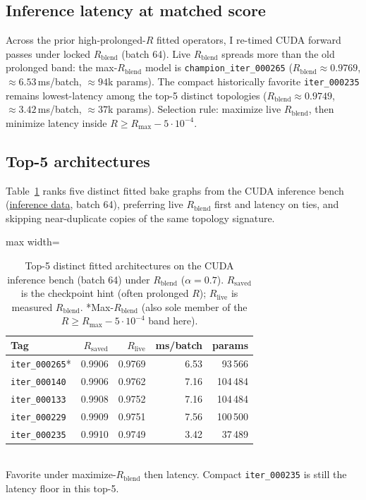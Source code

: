 \subsection{Inference latency at matched score}
\label{sec:inference-latency}
Across the prior high-prolonged-$R$ fitted operators, I re-timed CUDA forward passes under locked $R_{\mathrm{blend}}$ (batch 64).
Live $R_{\mathrm{blend}}$ spreads more than the old prolonged band: the max-$R_{\mathrm{blend}}$ model is
\texttt{champion\_iter\_000265} ($R_{\mathrm{blend}}{\approx}0.9769$, $\approx 6.53$\,ms/batch, $\approx 94$k params).
The compact historically favorite \texttt{iter\_000235} remains lowest-latency among the top-5 distinct topologies
($R_{\mathrm{blend}}{\approx}0.9749$, $\approx 3.42$\,ms/batch, $\approx 37$k params).
Selection rule: maximize live $R_{\mathrm{blend}}$, then minimize latency inside $R\ge R_{\max}-5\cdot10^{-4}$.

\subsection{Top-5 architectures}
\label{sec:top5-arch}
Table~\ref{tab:top5} ranks five distinct fitted bake graphs from the CUDA inference bench
(\href{https://github.com/reeldemo/denoise-opt}{inference data}, batch 64), preferring live $R_{\mathrm{blend}}$ first and latency on ties,
and skipping near-duplicate copies of the same topology signature.

\begin{table}[htbp]
  \centering
  \caption{Top-5 distinct fitted architectures on the CUDA inference bench (batch 64) under $R_{\mathrm{blend}}$ ($\alpha{=}0.7$).
  $R_{\mathrm{saved}}$ is the checkpoint hint (often prolonged $R$); $R_{\mathrm{live}}$ is measured $R_{\mathrm{blend}}$.
  *Max-$R_{\mathrm{blend}}$ (also sole member of the $R\ge R_{\max}-5\cdot10^{-4}$ band here).}
  \label{tab:top5}
  \setlength{\tabcolsep}{3pt}
  \begin{adjustbox}{max width=\columnwidth}
\begin{tabular}{@{}lrrrr@{}}
    \toprule
    Tag & $R_{\mathrm{saved}}$ & $R_{\mathrm{live}}$ & ms/batch & params \\
    \midrule
    \texttt{iter\_000265}* & 0.9906 & 0.9769 & 6.53 & 93\,566 \\
    \texttt{iter\_000140} & 0.9906 & 0.9762 & 7.16 & 104\,484 \\
    \texttt{iter\_000133} & 0.9908 & 0.9752 & 7.16 & 104\,484 \\
    \texttt{iter\_000229} & 0.9909 & 0.9751 & 7.56 & 100\,500 \\
    \texttt{iter\_000235} & 0.9910 & 0.9749 & 3.42 & 37\,489 \\
    \bottomrule
  \end{tabular}
\end{adjustbox}\\[0.4em]
  {\footnotesize *Favorite under maximize-$R_{\mathrm{blend}}$ then latency. Compact \texttt{iter\_000235} is still the latency floor in this top-5.}
\end{table}

